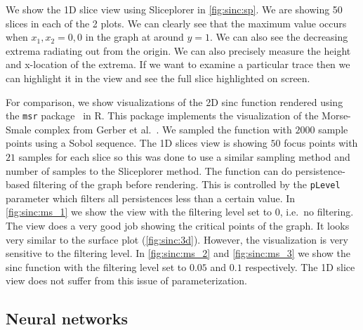 We show the 1D slice view using Sliceplorer in \autoref{fig:sinc:sp}.
We are showing 50 slices in each of the 2 plots. We can clearly see that
the maximum value occurs when $x_1,x_2 = 0,0$ in the graph at around $y=1$.
We can also see the decreasing extrema radiating out from the origin. We can
also precisely measure the height and x-location of the extrema. If we want
to examine a particular trace then we can highlight it in the view and see
the full slice highlighted on screen.

For comparison, we show visualizations of the 2D sinc function rendered using
the \texttt{msr} package~\cite{Gerber:2012} in R. This package implements the
visualization of the Morse-Smale complex from Gerber et al.~\cite{Gerber:2010}.
We sampled the function with $2000$ sample points using a Sobol sequence. The
1D slices view is showing $50$ focus points with $21$ samples for each slice so
this was done to use a similar sampling method and number of samples to the
Sliceplorer method. The function can do persistence-based filtering of the
graph before rendering.  This is controlled by the \texttt{pLevel} parameter
which filters all persistences less than a certain value. In
\autoref{fig:sinc:ms_1} we show the view with the filtering level set to $0$,
i.e.\ no filtering. The view does a very good job showing the critical points
of the graph. It looks very similar to the surface plot
(\autoref{fig:sinc:3d}). However, the visualization is very sensitive to the
filtering level. In \autoref{fig:sinc:ms_2} and \autoref{fig:sinc:ms_3} we show
the sinc function with the filtering level set to $0.05$ and $0.1$
respectively.  The 1D slice view does not suffer from this issue of
parameterization.

\subsection{Neural networks}\label{neural-networks}

